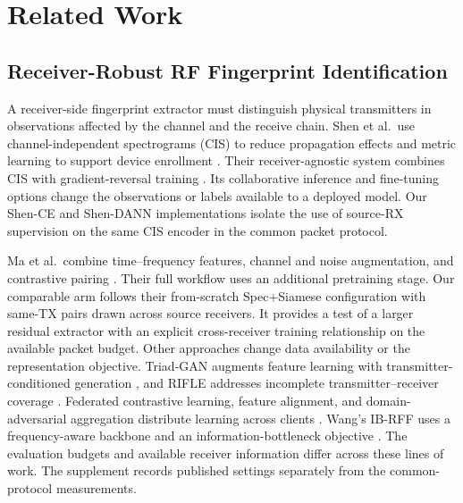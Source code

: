 \documentclass[journal]{IEEEtran}
\begin{document}
\section{Related Work}
\subsection{Receiver-Robust RF Fingerprint Identification}
A receiver-side fingerprint extractor must distinguish physical transmitters in observations affected by the channel and the receive chain. Shen et al.\ use channel-independent spectrograms (CIS) to reduce propagation effects and metric learning to support device enrollment \cite{shen2022scalable}. Their receiver-agnostic system combines CIS with gradient-reversal training \cite{shen2024receiver,ganin2016domain}. Its collaborative inference and fine-tuning options change the observations or labels available to a deployed model. Our Shen-CE and Shen-DANN implementations isolate the use of source-RX supervision on the same CIS encoder in the common packet protocol.

Ma et al.\ combine time--frequency features, channel and noise augmentation, and contrastive pairing \cite{chen2020simclr,ma2025wcnc,ma2025robust}. Their full workflow uses an additional pretraining stage. Our comparable arm follows their from-scratch Spec+Siamese configuration with same-TX pairs drawn across source receivers. It provides a test of a larger residual extractor with an explicit cross-receiver training relationship on the available packet budget. Other approaches change data availability or the representation objective. Triad-GAN augments feature learning with transmitter-conditioned generation \cite{wang2026triad}, and RIFLE addresses incomplete transmitter--receiver coverage \cite{zhang2026rifle}. Federated contrastive learning, feature alignment, and domain-adversarial aggregation distribute learning across clients \cite{shen2024federated,wang2026fedalign,gul2026federated}. Wang's IB-RFF uses a frequency-aware backbone and an information-bottleneck objective \cite{wang2026ib}. The evaluation budgets and available receiver information differ across these lines of work. The supplement records published settings separately from the common-protocol measurements.
\end{document}

